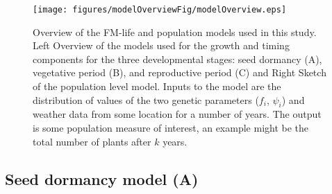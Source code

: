 \begin{figure}[tb]
  \centering
\texttt{[image: figures/modelOverviewFig/modelOverview.eps]}
\caption{Overview of the FM-life and population models used in this study. Left
  Overview of the models used for the growth and timing components for the three
  developmental stages: seed dormancy (A), vegetative period (B), and
  reproductive period (C) and Right Sketch of the population level model. Inputs
  to the model are the distribution of values of the two genetic parameters
  (\(f_{i}\), \(\psi_{i}\)) and weather data from some location for a number of
  years. The output is some population measure of interest, an example might be
  the total number of plants after \(k\) years.}
\label{fig:overview}
\end{figure}

\subsection{Seed dormancy model (A)}
\label{seed-dormancy-model-a}

